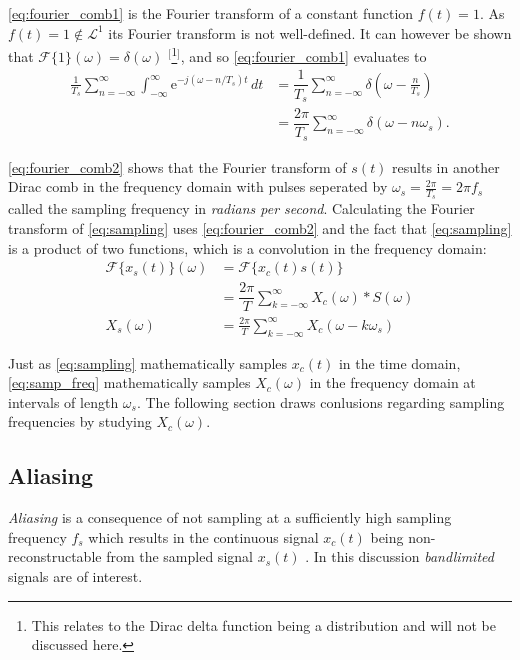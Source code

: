 \eqref{eq:fourier_comb1} is the Fourier transform of a constant function $f(t) = 1$. As $f(t) = 1 \notin \mathcal{L}^1$ its Fourier transform is not well-defined. It can however be shown that $\mathcal{F}\{1\}(\omega) = \delta(\omega)$ $^[$\footnote{This relates to the Dirac delta function being a distribution and will not be discussed here.}$^]$, and so \eqref{eq:fourier_comb1} evaluates to
\begin{align} \label{eq:fourier_comb2}
\frac{1}{T_s} \sum_{n=-\infty}^{\infty} \int_{-\infty}^{\infty} \! \mathrm{e}^{-j(\omega-n/T_s)t} \, dt &= \dfrac{1}{T_s}\sum_{n=-\infty}^{\infty} \delta\left(\omega-\frac{n}{T_s}\right) \nonumber \\
&= \dfrac{2\pi}{T_s} \sum_{n=-\infty}^{\infty} \delta(\omega-n\omega_s).
\end{align}

\eqref{eq:fourier_comb2} shows that the Fourier transform of $s(t)$ results in another Dirac comb in the frequency domain with pulses seperated by $\omega_s=\frac{2\pi}{T_s}=2\pi f_s$ called the sampling frequency in \textit{radians per second}.
Calculating the Fourier transform of \eqref{eq:sampling} uses \eqref{eq:fourier_comb2} and the fact that \eqref{eq:sampling} is a product of two functions, which is a convolution in the frequency domain:
\begin{align} \label{eq:samp_freq}
\mathcal{F}\{x_s(t)\}(\omega) &= \mathcal{F}\{x_c(t)s(t)\} \nonumber \\
&= \dfrac{2\pi}{T} \sum_{k=-\infty}^{\infty} X_c(\omega) * S(\omega) \nonumber \\
X_s(\omega)&=\frac{2\pi}{T}\sum_{k=-\infty}^{\infty}X_c(\omega-k\omega_s)
\end{align}

Just as \eqref{eq:sampling} mathematically samples $x_c(t)$ in the time domain, \eqref{eq:samp_freq} mathematically samples $X_c(\omega)$ in the frequency domain at intervals of length $\omega_s$. The following section draws conlusions regarding sampling frequencies by studying $X_c(\omega)$.

\subsection{Aliasing} \label{sec:aliasing}
\textit{Aliasing} is a consequence of not sampling at a sufficiently high sampling frequency $f_s$ which results in the continuous signal $x_c(t)$ being non-reconstructable from the sampled signal $x_s(t)$ \cite{pages 166-170, DTSP}. In this discussion \textit{bandlimited} signals are of interest.

